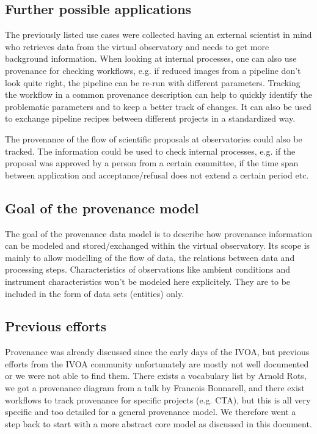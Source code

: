 \documentclass[11pt,a4paper]{ivoa}
\begin{document}
\subsection{Further possible applications}
The previously listed use cases were collected having an external scientist in mind who retrieves data from the virtual observatory and needs to get more background information. When looking at internal processes, one can also use provenance for checking workflows, e.g. if reduced images from a pipeline don't look quite right, the pipeline can be re-run with different parameters. Tracking the workflow in a common provenance description can help to quickly identify the problematic parameters and to keep a better track of changes. It can also be used to exchange pipeline recipes between different projects in a standardized way.

The provenance of the flow of scientific proposals at observatories could also be tracked. The information could be used to check internal processes, e.g. if the proposal was approved by a person from a certain committee, if the time span between application and acceptance/refusal does not extend a certain period etc. 


\subsection{Goal of the provenance model}
The goal of the provenance data model is to describe how provenance information can be modeled and stored/exchanged within the virtual observatory. Its scope is mainly to allow modelling of the flow of data, the relations between data and processing steps. Characteristics of observations like ambient conditions and instrument characteristics won't be modeled here explicitely. They are to be included in the form of data sets (entities) only.


\subsection{Previous efforts}
Provenance was already discussed since the early days of the IVOA, but previous efforts from the IVOA community unfortunately are mostly not well documented or we were not able to find them. 
There exists a vocabulary list by Arnold Rots, we got a provenance diagram from a talk by Francois Bonnarell, and there exist workflows to track provenance for specific projects (e.g. CTA), but this is all very specific and too detailed for a general provenance model. We therefore went a step back to start with a more abstract core model as discussed in this document.
\end{document}
